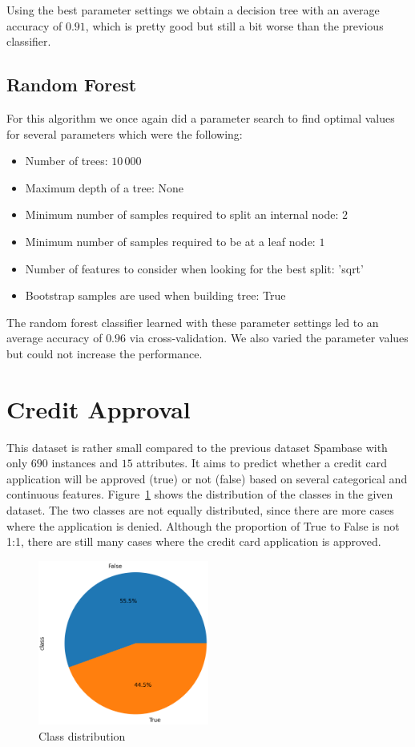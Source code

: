 \documentclass[a4paper,11pt]{article}
\begin{document}
        Using the best parameter settings we obtain a decision tree with an average accuracy of $0.91$, which is pretty good but still a bit worse than the previous classifier.

    \subsection{Random Forest}
        For this algorithm we once again did a parameter search to find optimal values for several parameters which were the following:
        \begin{itemize}
                \item Number of trees: $10\,000$
                \item Maximum depth of a tree: None
                \item Minimum number of samples required to split an internal node: $2$
                \item Minimum number of samples required to be at a leaf node: $1$
                \item Number of features to consider when looking for the best split: 'sqrt'
                \item Bootstrap samples are used when building tree: True
        \end{itemize}
        The random forest classifier learned with these parameter settings led to an average accuracy of $0.96$ via cross-validation. We also varied the parameter values but could not increase the performance.


\section{Credit Approval}
    This dataset is rather small compared to the previous dataset Spambase with only $690$ instances and $15$ attributes. It aims to predict whether a credit card application will be approved (true) or not (false) based on several categorical and continuous features. Figure~\ref{fig:credit-approval_classes_pie} shows the distribution of the classes in the given dataset. The two classes are not equally distributed, since there are more cases where the application is denied. 
    Although the proportion of True to False is not 1:1, there are still many cases where the credit card application is approved.
    \begin{figure}[h!]
        \centering
        \includegraphics[width=0.5\textwidth]{exercise_1/paper/figures/credit_approval_pie.png}
        \caption{Class distribution}
        \label{fig:credit-approval_classes_pie}
    \end{figure}
    
\end{document}
